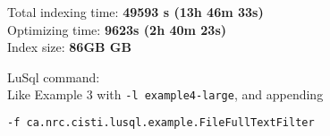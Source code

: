 \noindent Total indexing time: {\bf 49593 s (13h 46m 33s)} \\
Optimizing time: {\bf 9623s (2h 40m 23s)} \\
Index size: {\bf 86GB GB}

\noindent LuSql command:  \\
\noindent Like Example 3 with {\tt -l example4-large}, and appending
\begin{lstlisting}[backgroundcolor=\color{grey},language=Bash]
 -f ca.nrc.cisti.lusql.example.FileFullTextFilter
\end{lstlisting}








